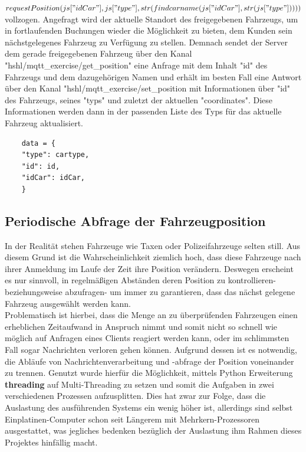 \textit{$requestPosition(js["idCar"],js["type"],\\str(findcarname(js["idCar"],str(js["type"]))))$}
vollzogen. Angefragt wird der aktuelle Standort des freigegebenen Fahrzeugs, um in fortlaufenden Buchungen wieder die Möglichkeit zu bieten, dem Kunden sein nächstgelegenes Fahrzeug zu Verfügung zu stellen. Demnach sendet der Server dem gerade freigegebenen Fahrzeug über den Kanal \textsf{"hshl/mqtt\_exercise/get\_position"} eine Anfrage mit dem Inhalt "id" des Fahrzeugs und dem dazugehörigen Namen und erhält im besten Fall eine Antwort über den Kanal \textsf{"hshl/mqtt\_exercise/set\_position} mit Informationen über "id" des Fahrzeugs, seines "typs" und zuletzt der aktuellen "coordinates". Diese Informationen werden dann in der passenden Liste des Typs für das aktuelle Fahrzeug aktualisiert.
\begin{lstlisting}
    data = {
    "type": cartype,
    "id": id,
    "idCar": idCar,
    }
\end{lstlisting}
\subsection{Periodische Abfrage der Fahrzeugposition}
In der Realität stehen Fahrzeuge wie Taxen oder Polizeifahrzeuge selten still. Aus diesem Grund ist die Wahrscheinlichkeit ziemlich hoch, dass diese Fahrzeuge nach ihrer Anmeldung im Laufe der Zeit ihre Position verändern. Deswegen erscheint es nur sinnvoll, in regelmäßigen Abständen deren Position zu kontrollieren- beziehungsweise abzufragen- um immer zu garantieren, dass das nächst gelegene Fahrzeug ausgewählt werden kann.\\ Problematisch ist hierbei, dass die Menge an zu überprüfenden Fahrzeugen einen erheblichen Zeitaufwand in Anspruch nimmt und somit nicht so schnell wie möglich auf Anfragen eines Clients reagiert werden kann, oder im schlimmsten Fall sogar Nachrichten verloren gehen können. Aufgrund dessen ist es notwendig, die Abläufe von Nachrichtenverarbeitung und -abfrage der Position voneinander zu trennen. Genutzt wurde hierfür die Möglichkeit, mittels Python Erweiterung \textbf{threading} auf Multi-Threading zu setzen und somit die Aufgaben in zwei verschiedenen Prozessen aufzusplitten. Dies hat zwar zur Folge, dass die Auslastung des ausführenden Systems ein wenig höher ist, allerdings sind selbst Einplatinen-Computer schon seit Längerem mit Mehrkern-Prozessoren ausgestattet, was jegliches bedenken bezüglich der Auslastung ihm Rahmen dieses Projektes hinfällig macht.

